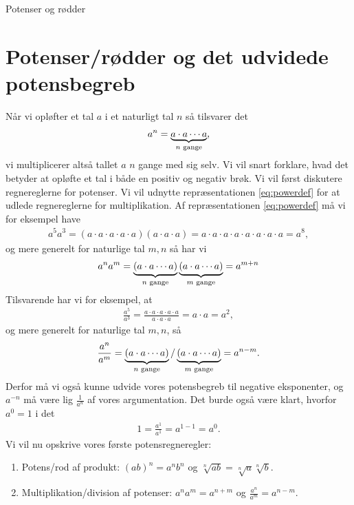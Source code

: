 \begin{center}
\Huge
Potenser og rødder
\end{center}


\section*{Potenser/rødder og det udvidede potensbegreb}

Når vi opløfter et tal $a$ i et naturligt tal $n$ så tilsvarer det
\begin{align}\label{eq:powerdef}
a^n = \underbrace{a\cdot a \cdots a}_{n\textnormal{ gange}},
\end{align}
vi multiplicerer altså tallet $a$ $n$ gange med sig selv. Vi vil snart forklare, hvad det betyder at opløfte et tal i både en positiv og negativ brøk. Vi vil først diskutere regnereglerne for potenser. Vi vil udnytte repræsentationen \eqref{eq:powerdef} for at udlede regnereglerne for multiplikation.
Af repræsentationen \eqref{eq:powerdef} må vi for eksempel have
\begin{align*}
a^5a^3 = (a\cdot a\cdot a\cdot a\cdot a)(a\cdot a\cdot a) = a\cdot a\cdot a\cdot a\cdot a\cdot a\cdot a\cdot a = a^8, 
\end{align*}
og mere generelt for naturlige tal $m,n$ så har vi
\begin{align*}
a^na^m = \underbrace{(a\cdot a\cdots a)}_{n \textnormal{ gange}}\underbrace{(a\cdot a\cdots a)}_{m \textnormal{ gange}} = a^{m+n}
\end{align*}
Tilsvarende har vi for eksempel, at 
\begin{align*}
\frac{a^5}{a^3} = \frac{a\cdot a\cdot a\cdot a\cdot a}{a\cdot a\cdot a} = a\cdot a =a^2,
\end{align*}
og mere generelt for naturlige tal $m,n$, så
\begin{align*}
\frac{a^n}{a^m} = \underbrace{(a \cdot a \cdots a)}_{n\textnormal{ gange}}/\underbrace{(a \cdot a \cdots a)}_{m\textnormal{ gange}} = a^{n-m}.
\end{align*}
Derfor må vi også kunne udvide vores potensbegreb til negative eksponenter, og $a^{-n}$ må være lig $\frac{1}{a^n}$ af vores argumentation. Det burde også være klart, hvorfor $a^0 =1$ i det 
\begin{align*}
1 = \frac{a^{1}}{a^{1}} = a^{1-1} = a^0.
\end{align*}
Vi vil nu opskrive vores første potensregneregler:
\begin{enumerate}[label=\roman*)]
\item Potens/rod af produkt: $(ab)^n =a^nb^n $ og $\sqrt[n]{ab} = \sqrt[n]{a}\sqrt[n]{b}$.
\item Multiplikation/division af potenser: $a^na^m = a^{n+m}$ og $\frac{a^n}{a^m} = a^{n-m}$.
\end{enumerate}
